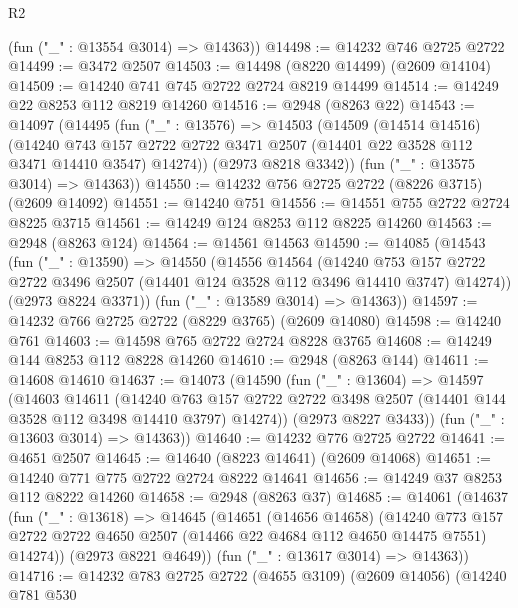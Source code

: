 \begin{lexlean}{R2}
\begin{coremodule}
      (fun ("_" : @13554 @3014) => @14363))
@14498 := @14232 @746 @2725 @2722
@14499 := @3472 @2507
@14503 := @14498 (@8220 @14499) (@2609 @14104)
@14509 := @14240 @741 @745 @2722 @2724 @8219 @14499
@14514 := @14249 @22 @8253 @112 @8219 @14260
@14516 := @2948 (@8263 @22)
@14543 := @14097
    (@14495
      (fun ("_" : @13576) =>
      @14503
        (@14509
          (@14514 @14516)
          (@14240
            @743
            @157
            @2722
            @2722
            @3471
            @2507
            (@14401 @22 @3528 @112 @3471 @14410 @3547)
            @14274))
        (@2973 @8218 @3342))
      (fun ("_" : @13575 @3014) => @14363))
@14550 := @14232 @756 @2725 @2722 (@8226 @3715) (@2609 @14092)
@14551 := @14240 @751
@14556 := @14551 @755 @2722 @2724 @8225 @3715
@14561 := @14249 @124 @8253 @112 @8225 @14260
@14563 := @2948 (@8263 @124)
@14564 := @14561 @14563
@14590 := @14085
    (@14543
      (fun ("_" : @13590) =>
      @14550
        (@14556
          @14564
          (@14240
            @753
            @157
            @2722
            @2722
            @3496
            @2507
            (@14401 @124 @3528 @112 @3496 @14410 @3747)
            @14274))
        (@2973 @8224 @3371))
      (fun ("_" : @13589 @3014) => @14363))
@14597 := @14232 @766 @2725 @2722 (@8229 @3765) (@2609 @14080)
@14598 := @14240 @761
@14603 := @14598 @765 @2722 @2724 @8228 @3765
@14608 := @14249 @144 @8253 @112 @8228 @14260
@14610 := @2948 (@8263 @144)
@14611 := @14608 @14610
@14637 := @14073
    (@14590
      (fun ("_" : @13604) =>
      @14597
        (@14603
          @14611
          (@14240
            @763
            @157
            @2722
            @2722
            @3498
            @2507
            (@14401 @144 @3528 @112 @3498 @14410 @3797)
            @14274))
        (@2973 @8227 @3433))
      (fun ("_" : @13603 @3014) => @14363))
@14640 := @14232 @776 @2725 @2722
@14641 := @4651 @2507
@14645 := @14640 (@8223 @14641) (@2609 @14068)
@14651 := @14240 @771 @775 @2722 @2724 @8222 @14641
@14656 := @14249 @37 @8253 @112 @8222 @14260
@14658 := @2948 (@8263 @37)
@14685 := @14061
    (@14637
      (fun ("_" : @13618) =>
      @14645
        (@14651
          (@14656 @14658)
          (@14240
            @773
            @157
            @2722
            @2722
            @4650
            @2507
            (@14466 @22 @4684 @112 @4650 @14475 @7551)
            @14274))
        (@2973 @8221 @4649))
      (fun ("_" : @13617 @3014) => @14363))
@14716 := @14232
    @783
    @2725
    @2722
    (@4655 @3109)
    (@2609 @14056)
    (@14240
      @781
      @530

\end{coremodule}
\end{lexlean}
